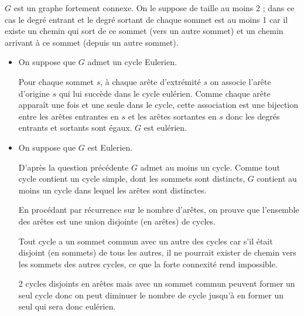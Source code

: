 \begin{Exercise}
$G$ est un graphe fortement connexe. On le suppose de taille au moins 2 ; dans ce cas le degré entrant et le degré sortant de chaque sommet est au moins 1 car il existe un chemin qui sort de ce sommet (vers un autre sommet) et un chemin arrivant à ce sommet (depuis un autre sommet).

\begin{itemize}
    \item On suppose que $G$ admet un cycle Eulerien.
    
    Pour chaque sommet $s$, à chaque arête d'extrémité $s$ on associe l'arête d'origine $s$ qui lui succède dans le cycle eulérien. Comme chaque arête apparaît une fois et une seule dans le cycle, cette association est une bijection entre les arêtes entrantes en $s$ et les arêtes sortantes en $s$ donc les degrés entrants et sortants sont égaux. $G$ est eulérien.
    
    \item On suppose que $G$ est Eulerien.
    
    D'après la question précédente $G$ admet au moins un cycle. Comme tout cycle contient un cycle simple, dont les sommets sont distincts, $G$ contient au moins un cycle dans lequel les arêtes sont distinctes.
    
    En procédant par récurrence sur le nombre d'arêtes, on prouve que l'ensemble des arêtes est une union disjointe (en arêtes) de cycles.
    
    Tout cycle a un sommet commun avec un autre des cycles car s'il était disjoint (en sommets) de tous les autres, il ne pourrait exister de chemin vers les sommets des autres cycles, ce que la forte connexité rend impossible.
    
    2 cycles disjoints en arêtes mais avec un sommet commun peuvent former un seul cycle donc on peut diminuer le nombre de cycle jusqu'à en former un seul qui sera donc eulérien.   
\end{itemize}
\end{Exercise} 
